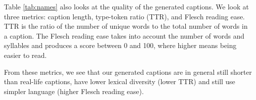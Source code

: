 Table \ref{tab:names} also looks at the quality of the generated captions. We
look at three metrics: caption length, type-token ratio (TTR), and Flesch
reading ease. TTR is the ratio of the number of unique words to the total
number of words in a caption. The Flesch reading ease takes into account the
number of words and syllables and produces a score between 0 and 100, where
higher means being easier to read.

From these metrics, we see that our generated captions are in general still
shorter than real-life captions, have lower lexical diversity (lower TTR)
and still use simpler language (higher Flesch reading ease).
